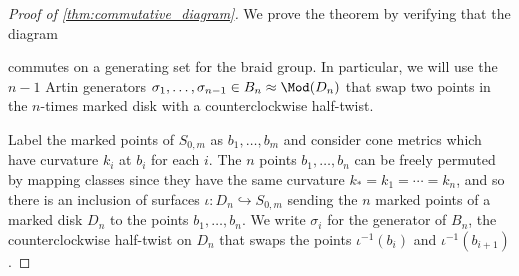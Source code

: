 \documentclass{amsart}
\begin{document}
    \begin{proof}[Proof of \cref{thm:commutative_diagram}]
        We prove the theorem by verifying that the diagram
        \begin{center}
        \end{center}
        commutes on a generating set for the braid group. In particular, we will use the $n-1$ Artin generators $\sigma_1,\dotsc,\sigma_{n-1} \in B_n \approx \Mod(D_n)$ that swap two points in the $n$-times marked disk with a counterclockwise half-twist.
        
        Label the marked points of $S_{0,m}$ as $b_1,\dotsc,b_m$ and consider cone metrics which have curvature $k_i$ at $b_i$ for each $i$. The $n$ points $b_1,\dotsc,b_n$ can be freely permuted by mapping classes since they have the same curvature $k_*=k_1 = \dotsb = k_n$, and so there is an inclusion of surfaces $\iota:D_n \hookrightarrow S_{0,m}$ sending the $n$ marked points of a marked disk $D_n$ to the points $b_1,\dotsc,b_n$. We write $\sigma_i$ for the generator of $B_n$, the counterclockwise half-twist on $D_n$ that swaps the points $\iota^{-1}(b_i)$ and $\iota^{-1}(b_{i+1})$.
        
        

\end{proof}
\end{document}
